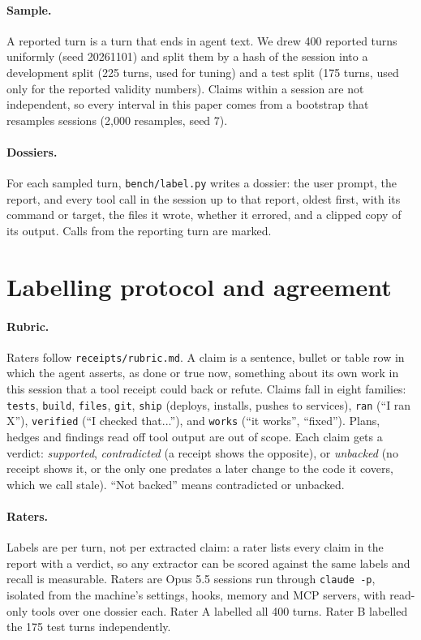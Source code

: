 \documentclass[11pt]{article}
\begin{document}
\paragraph{Sample.} A reported turn is a turn that ends in agent text. We drew 400 reported turns uniformly
(seed 20261101) and split them by a hash of the session into a development split (225 turns, used for tuning)
and a test split (175 turns, used only for the reported validity numbers). Claims within a session are not
independent, so every interval in this paper comes from a bootstrap that resamples sessions (2,000 resamples,
seed 7).

\paragraph{Dossiers.} For each sampled turn, \texttt{bench/label.py} writes a dossier: the user prompt, the
report, and every tool call in the session up to that report, oldest first, with its command or target, the
files it wrote, whether it errored, and a clipped copy of its output. Calls from the reporting turn are marked.

\section{Labelling protocol and agreement}

\paragraph{Rubric.} Raters follow \texttt{receipts/rubric.md}. A claim is a sentence, bullet or table row in which
the agent asserts, as done or true now, something about its own work in this session that a tool receipt could
back or refute. Claims fall in eight families: \texttt{tests}, \texttt{build}, \texttt{files}, \texttt{git},
\texttt{ship} (deploys, installs, pushes to services), \texttt{ran} (``I ran X''), \texttt{verified}
(``I checked that...''), and \texttt{works} (``it works'', ``fixed''). Plans, hedges and findings read off tool
output are out of scope. Each claim gets a verdict: \emph{supported}, \emph{contradicted} (a receipt shows the
opposite), or \emph{unbacked} (no receipt shows it, or the only one predates a later change to the code it
covers, which we call stale). ``Not backed'' means contradicted or unbacked.

\paragraph{Raters.} Labels are per turn, not per extracted claim: a rater lists every claim in the report with a
verdict, so any extractor can be scored against the same labels and recall is measurable. Raters are Opus 5.5
sessions run through \texttt{claude -p}, isolated from the machine's settings, hooks, memory and MCP servers,
with read-only tools over one dossier each. Rater A labelled all 400 turns. Rater B labelled the 175 test turns
independently.
\end{document}
